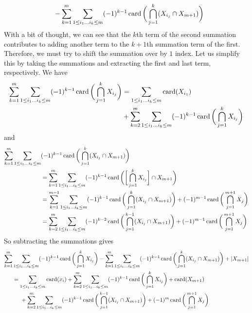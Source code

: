 \begin{solution}
\begin{align*}
      & \;\;\;\;\;\; - \sum_{k=1}^m \sum_{1 \leq i_1 \ldots i_k \leq m} (-1)^{k-1} \operatorname{card}\bigg( \bigcap_{j=1}^k (X_{i_j} \cap X_{m+1}) \bigg) 
    \end{align*}
    With a bit of thought, we can see that the $k$th term of the second summation contributes to adding another term to the $k+1$th summation term of the first. Therefore, we must try to shift the summation over by $1$ index. Let us simplify this by taking the summations and extracting the first and last term, respectively. We have 
    \begin{align*}
    \sum_{k=1}^m \sum_{1 \leq i_1 \ldots i_k \leq m} (-1)^{k-1} \operatorname{card}\bigg( \bigcap_{j=1}^k X_{i_j} \bigg) &= \sum_{1 \leq i_1 \ldots i_k \leq m} \operatorname{card}(X_{i_1}) \\
    &+ \sum_{k=2}^m \sum_{1 \leq i_1 \ldots i_k \leq m} (-1)^{k-1} \operatorname{card}\bigg( \bigcap_{j=1}^k X_{i_j} \bigg)
    \end{align*}
    and 
    \begin{align*}
      \sum_{k=1}^m \sum_{1 \leq i_1 \ldots i_k \leq m} & (-1)^{k-1} \operatorname{card}\bigg( \bigcap_{j=1}^k (X_{i_j} \cap X_{m+1}) \bigg) \\
      & = \sum_{k=1}^m \sum_{1 \leq i_1 \ldots i_k \leq m} (-1)^{k-1} \operatorname{card}\bigg( \bigg[ \bigcap_{j=1}^k X_{i_j} \bigg] \cap X_{m+1} \bigg) \\
      & =  \sum_{k=1}^{m-1} \sum_{1 \leq i_1 \ldots i_k \leq m} (-1)^{k-1} \operatorname{card}\bigg( \bigcap_{j=1}^k (X_{i_j} \cap X_{m+1}) \bigg) + (-1)^{m-1} \operatorname{card}\bigg( \bigcap_{j=1}^{m+1} X_j \bigg) \\
      & = \sum_{k=2}^{m} \sum_{1 \leq i_1 \ldots i_k \leq m} (-1)^{k-2} \operatorname{card}\bigg( \bigcap_{j=1}^{k-1} (X_{i_j} \cap X_{m+1}) \bigg) + (-1)^{m-1} \operatorname{card}\bigg( \bigcap_{j=1}^{m+1} X_j \bigg)
    \end{align*}
    So subtracting the summations gives 
    \begin{align*}
      \sum_{k=1}^m & \sum_{1 \leq i_1 \ldots i_k \leq m} (-1)^{k-1} \card\bigg( \bigcap_{j=1}^k X_{i_j} \bigg) - \sum_{k=1}^m \sum_{1 \leq i_1 \ldots i_k \leq m} (-1)^{k-1} \card\bigg( \bigcap_{j=1}^k (X_{i_j} \cap X_{m+1}) \bigg) + |X_{m+1}| \\
      & = \sum_{1 \leq i_1 \ldots i_k \leq m} \card(x_i) + \sum_{k=2}^m \sum_{1 \leq i_1 \ldots i_k \leq m} (-1)^{k-1} \card\bigg( \bigcap_{j=1}^k X_{i_j} \bigg) + \card(X_{m+1})\\
      & \;\;\;\;\; + \sum_{k=2}^{m} \sum_{1 \leq i_1 \ldots i_k \leq m} (-1)^{k-1} \card\bigg( \bigcap_{j=1}^{k-1} (X_{i_j} \cap X_{m+1}) \bigg) + (-1)^{m} \card\bigg( \bigcap_{j=1}^{m+1} X_j \bigg) \\

\end{align*}
\end{solution}
